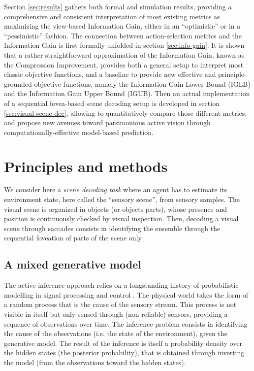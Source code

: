 \documentclass[12pt,twoside,openright]{article}
\begin{document}
Section \ref{sec:results} gathers  both formal and simulation results, providing a comprehensive and consistent interpretation of most existing metrics as maximizing the view-based Information Gain, either in an ``optimistic'' or in a ``pessimistic'' fashion. The connection between action-selection metrics and the Information Gain is first formally unfolded in section \ref{sec:info-gain}.  It is shown that a rather straightforward approximation of the Information Gain,
known as the Compression Improvement, provides both a general setup to interpret most classic objective functions, and a baseline to provide new effective and  principle-grounded objective functions, namely the Information Gain Lower Bound (IGLB) and the Information Gain Upper Bound (IGUB).
Then an actual implementation of a sequential fovea-based scene decoding setup
is developed in section \ref{sec:visual-scene-dec}, allowing to quantitatively compare those different metrics, and propose new avenues toward parsimonious active vision through computationally-effective model-based prediction.


\section{Principles and methods} \label{sec:material}

We consider here a \emph{scene decoding task} where an agent has to estimate its environment state, here called the ``sensory scene'', from sensory samples. The visual scene is organized in objects (or objects parts), whose presence and position is continuously checked by visual inspection. 
Then, decoding a visual scene through saccades consists in identifying the ensemble through the sequential foveation of parts of the scene only. 

\subsection{A mixed generative model}\label{sec:three-party}

The active inference approach relies on a longstanding history of probabilistic modelling in signal processing and control \citep{Kalman1960,Baum1966}. The physical world takes the form of a random  process that is the cause of the sensory stream. This process is not visible in itself but only sensed through (non reliable) sensors, providing a sequence of observations over time. The inference problem consists in identifying the cause of the observations (i.e. the state of the environment), given the generative model. The result of the inference is itself a probability density over the hidden states (the posterior probability), that is obtained through  inverting the model (from the observations toward the hidden states).
\end{document}
